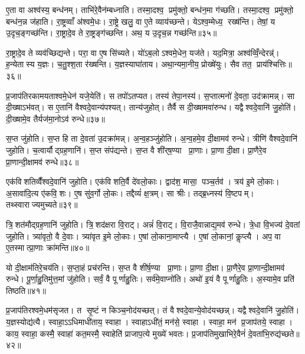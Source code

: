 ए॒ता वा अश्व॑स्य॒ बन्ध॑नम्। ताभि॑रे॒वैन॑म्बध्नाति। तस्मा॒दश्व॒ प्रमु॑क्तो॒ बन्ध॑न॒मा ग॑च्छति। तस्मा॒दश्व॒ प्रमु॑क्तो॒ बन्ध॑न॒न्न ज॑हाति। रा॒ष्ट्रव्वाँ अ॑श्वमे॒धः। रा॒ष्ट्रे खलु॒ वा ए॒ते व्याय॑च्छन्ते। येऽश्व॒म्मेध्य॒ रख्ष॑न्ति। तेषां॒ य उ॒दृच॒ङ्गच्छ॑न्ति। रा॒ष्ट्रादे॒व ते रा॒ष्ट्रङ्ग॑च्छन्ति। अथ॒ य उ॒दृच॒न्न गच्छ॑न्ति॥३५॥

रा॒ष्ट्रादे॒व ते व्यव॑च्छिद्यन्ते। परा॒ वा ए॒ष सि॑च्यते। यो॑ऽब॒लोऽश्वमे॒धेन॒ यज॑ते। यद॒मित्रा॒ अश्व॑व्विँ॒न्देरन्न्॑। ह॒न्येतास्य य॒ज्ञः। च॒तु॒श्श॒ता र॑ख्षन्ति। य॒ज्ञस्याघा॑ताय। अथा॒न्यमा॒नीय॒ प्रोख्षे॑युः। सैव तत॒ प्राय॑श्चित्तिः॥३६॥\anuvakamend[ग॒च्छ॒ति॒ भ॒व॒त॒ प॒थ्सु जु॑होति॒ न गच्छ॑न्ति॒ नव॑ च]

प्र॒जाप॑तिरकामयताश्वमे॒धेन॑ यजे॒येति॑। स तपो॑ऽतप्यत। तस्य॑ तेपा॒नस्य॑। स॒प्तात्मनो॑ दे॒वता॒ उद॑क्रामन्न्। सा दी॒ख्षाऽभ॑वत्। स ए॒तानि॑ वैश्वदे॒वान्य॑पश्यत्। तान्य॑जुहोत्। तैर्वै स दी॒ख्षामवा॑रुन्ध। यद्वैश्वदे॒वानि॑ जु॒होति॑। दी॒ख्षामे॒व तैर्यज॑मा॒नोऽव॑ रुन्धे॥३७॥

स॒प्त जु॑होति। स॒प्त हि ता दे॒वता॑ उ॒दक्रा॑मन्न्। अ॒न्व॒हञ्जु॑होति। अ॒न्व॒हमे॒व दी॒क्षामव॑ रुन्धे। त्रीणि॑ वैश्वदे॒वानि॑ जुहोति। च॒त्वार्यौद्ग्रह॒णानि॑। स॒प्त संप॑द्यन्ते। स॒प्त वै शी॑र्‌ष॒ण्या प्रा॒णाः। प्रा॒णा दी॒क्षा। प्रा॒णैरे॒व प्रा॒णान्दी॒क्षामव॑ रुन्धे॥३८॥

एक॑विशतिव्वैँश्वदे॒वानि॑ जुहोति। एक॑विशति॒र्वै दे॑वलो॒काः। द्वाद॑श॒ मासा॒ पञ्च॒र्तव॑। त्रय॑ इ॒मे लो॒काः। अ॒सावा॑दि॒त्य ए॑कवि॒शः। ए॒ष सु॑व॒र्गो लो॒कः। तद्दैव्यं॑ क्ष॒त्रम्। सा श्रीः। तद्ब्र॒ध्नस्य॑ वि॒ष्टपम्। तथ्स्वाराज्यमुच्यते॥३९॥

त्रि॒शत॑मौद्ग्रह॒णानि॑ जुहोति। त्रि॒शद॑क्षरा वि॒राट्। अन्नं॑ वि॒राट्। वि॒राजै॒वान्नाद्य॒मव॑ रुन्धे। त्रे॒धा वि॒भज्य॑ दे॒वतां जुहोति। त्र्या॑वृतो॒ वै दे॒वाः। त्र्या॑वृत इ॒मे लो॒काः। ए॒षां लो॒काना॒माप्त्यै। ए॒षां लो॒कानां॒ कॢप्त्यै। अप॒ वा ए॒तस्मात्प्रा॒णाः क्रा॑मन्ति॥४०॥

यो दी॒क्षाम॑तिरे॒चय॑ति। स॒प्ता॒हं प्रच॑रन्ति। स॒प्त वै शी॑र्\mbox{}ष॒ण्या प्रा॒णाः। प्रा॒णा दी॒क्षा। प्रा॒णैरे॒व प्रा॒णान्दी॒क्षामव॑ रुन्धे। पू॒र्णा॒हु॒तिमु॑त्त॒मां जु॑होति। सर्वं॒ वै पूर्णाहु॒तिः। सर्व॑मे॒वाप्नो॑ति। अथो॑ इ॒यं वै पूर्णाहु॒तिः। अ॒स्यामे॒व प्रति॑ तिष्ठति॥४१॥\anuvakamend[रु॒न्धे॒ प्रा॒णान्दी॒क्षामव॑ रुन्ध उच्यते क्रामन्ति तिष्ठति]

प्र॒जाप॑तिरश्वमे॒धम॑सृजत। त सृ॒ष्टं न किञ्च॒नोद॑यच्छत्। तं वैश्वदे॒वान्ये॒वोद॑यच्छन्न्। यद्वैश्वदे॒वानि॑ जु॒होति॑। य॒ज्ञस्योद्य॑त्यै। स्वाहा॒ऽऽधिमाधी॑ताय॒ स्वाहा। स्वाहाऽधी॑तं॒ मन॑से॒ स्वाहा। स्वाहा॒ मन॑ प्र॒जाप॑तये॒ स्वाहा। काय॒ स्वाहा॒ कस्मै॒ स्वाहा॑ कत॒मस्मै॒ स्वाहेति॑ प्राजाप॒त्ये मुख्ये॑ भवतः। प्र॒जाप॑तिमुखाभिरे॒वैनं॑ दे॒वता॑भि॒रुद्य॑च्छते॥४२॥

